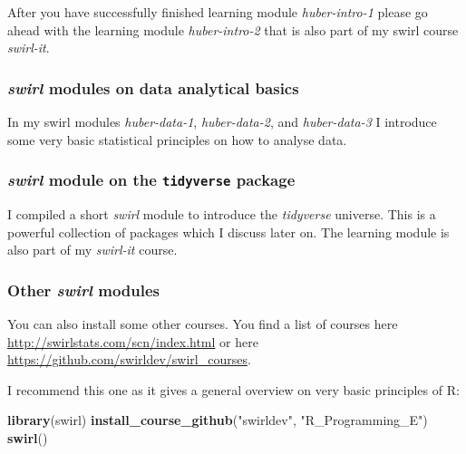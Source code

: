 \documentclass[
  12pt,
  oneside]{book}
\newenvironment{Shaded}{\begin{snugshade}}{\end{snugshade}}
\newcommand{\FunctionTok}[1]{\textcolor[rgb]{0.13,0.29,0.53}{\textbf{#1}}}
\newcommand{\NormalTok}[1]{#1}
\newcommand{\StringTok}[1]{\textcolor[rgb]{0.31,0.60,0.02}{#1}}
\begin{document}
After you have successfully finished learning module \emph{huber-intro-1} please go ahead with the learning module \emph{huber-intro-2} that is also part of my swirl course \emph{swirl-it}.

\hypertarget{swirl-modules-on-data-analytical-basics}{%
\subsubsection*{\texorpdfstring{\emph{swirl} modules on data analytical basics}{swirl modules on data analytical basics}}\label{swirl-modules-on-data-analytical-basics}}

In my swirl modules \emph{huber-data-1}, \emph{huber-data-2}, and \emph{huber-data-3} I introduce some very basic statistical principles on how to analyse data.

\hypertarget{swirl-module-on-the-tidyverse-package}{%
\subsubsection*{\texorpdfstring{\emph{swirl} module on the \texttt{tidyverse} package}{swirl module on the tidyverse package}}\label{swirl-module-on-the-tidyverse-package}}

I compiled a short \emph{swirl} module to introduce the \emph{tidyverse} universe. This is a powerful collection of packages which I discuss later on. The learning module is also part of my \emph{swirl-it} course.

\hypertarget{other-swirl-modules}{%
\subsubsection*{\texorpdfstring{Other \emph{swirl} modules}{Other swirl modules}}\label{other-swirl-modules}}

You can also install some other courses. You find a list of courses here \url{http://swirlstats.com/scn/index.html} or here \url{https://github.com/swirldev/swirl_courses}.

I recommend this one as it gives a general overview on very basic principles of R:

\begin{Shaded}
\begin{Highlighting}[]
\FunctionTok{library}\NormalTok{(swirl)}
\FunctionTok{install\_course\_github}\NormalTok{(}\StringTok{"swirldev"}\NormalTok{, }\StringTok{"R\_Programming\_E"}\NormalTok{)}
\FunctionTok{swirl}\NormalTok{()}
\end{Highlighting}
\end{Shaded}
\end{document}
